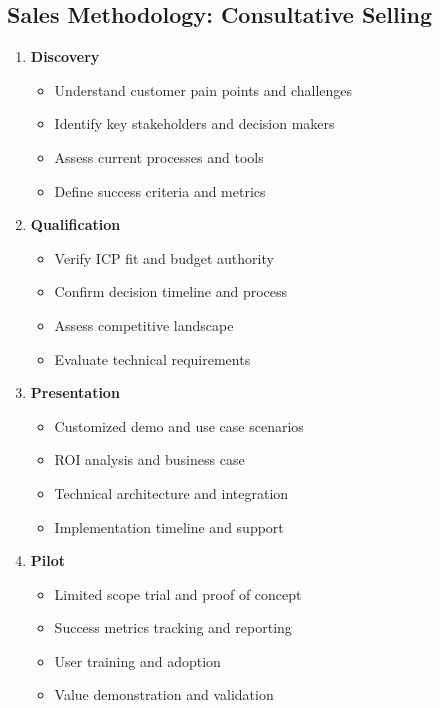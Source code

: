 \documentclass[business]{../templates/infraradar-main}
\begin{document}
\subsection{Sales Methodology: Consultative Selling}
\begin{enumerate}
    \item \textbf{Discovery}
    \begin{itemize}
        \item Understand customer pain points and challenges
        \item Identify key stakeholders and decision makers
        \item Assess current processes and tools
        \item Define success criteria and metrics
    \end{itemize}
    
    \item \textbf{Qualification}
    \begin{itemize}
        \item Verify ICP fit and budget authority
        \item Confirm decision timeline and process
        \item Assess competitive landscape
        \item Evaluate technical requirements
    \end{itemize}
    
    \item \textbf{Presentation}
    \begin{itemize}
        \item Customized demo and use case scenarios
        \item ROI analysis and business case
        \item Technical architecture and integration
        \item Implementation timeline and support
    \end{itemize}
    
    \item \textbf{Pilot}
    \begin{itemize}
        \item Limited scope trial and proof of concept
        \item Success metrics tracking and reporting
        \item User training and adoption
        \item Value demonstration and validation
    \end{itemize}
    

\end{enumerate}
\end{document}
